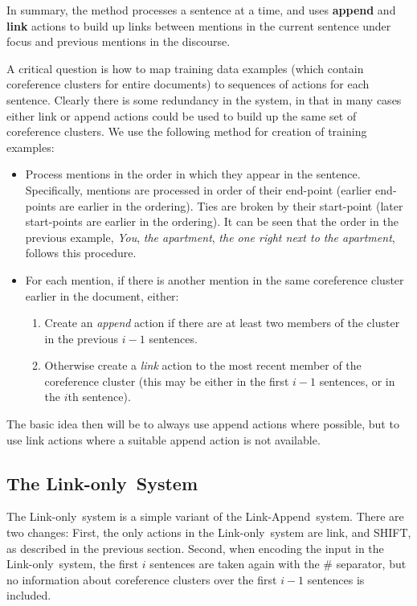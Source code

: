 \documentclass[11pt,a4paper]{article}
\newcommand{\LA}{Link-Append}
\newcommand{\LO}{Link-only}
\begin{document}
In summary, the method processes a sentence at a time, and uses {\bf append} and {\bf link} actions to build up links between mentions in the current sentence under focus and previous mentions in the discourse.

A critical question is how to map training data examples (which contain coreference clusters for entire documents) to sequences of actions for each sentence. Clearly there is some redundancy in the system, in that in many cases either link or append actions could be used to build up the same set of coreference clusters. We use the following method for creation of training examples:

\begin{itemize}
    \item Process mentions in the order in which they appear in the sentence. Specifically, mentions are processed in order of their end-point (earlier end-points are earlier in the ordering). Ties are broken by their start-point (later start-points are earlier in the ordering). It can be seen that the order in the previous example, {\em You}, {\em the apartment}, {\em the one right next to the apartment}, follows this procedure.
    
    \item For each mention, if there is another mention in the same coreference cluster earlier in the document, either:
    
    \begin{enumerate}
        \item Create an {\em append} action if there are at least two members of the cluster in the previous $i-1$ sentences.
        \item Otherwise create a {\em link} action to the most recent member of the coreference cluster (this may be either in the first $i-1$ sentences, or in the $i$th sentence).
    \end{enumerate}
    
\end{itemize}


The basic idea then will be to always use append actions where possible, but to use link actions where a suitable append action is not available. 

\subsection{The \LO~System}

The \LO~system is a simple variant of the \LA~system. There are two changes: First, the only actions in the \LO~system are link, and SHIFT, as described in the previous section. Second, when encoding the input in the \LO~system, the first $i$ sentences are taken again with the \# separator, but no information about coreference clusters over the first $i-1$ sentences is included.
\end{document}
